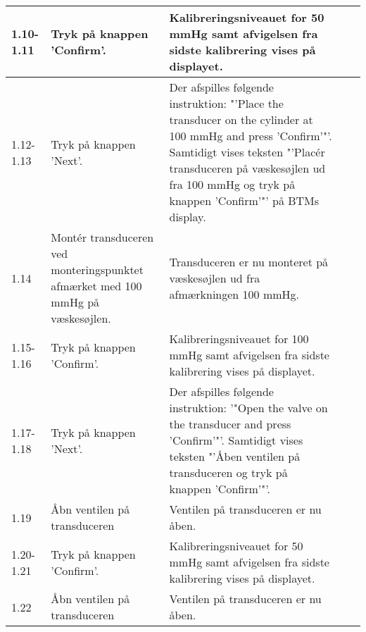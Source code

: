 \begin{tabular}{|p{1cm}|p{3cm}|p{4cm}|p{4cm}|p{2cm}|}
\hline

1.10-1.11 & Tryk på knappen 'Confirm'. & Kalibreringsniveauet for 50 mmHg samt afvigelsen fra sidste kalibrering vises på displayet. &  & \\\hline

1.12-1.13 & Tryk på knappen 'Next'. & Der afspilles følgende instruktion: "'Place the transducer on the cylinder at 100 mmHg and press 'Confirm'"'. Samtidigt vises teksten "'Placér transduceren på væskesøjlen ud fra 100 mmHg og tryk på knappen 'Confirm'"' på BTMs display. &  & \\\hline

1.14 & Montér transduceren ved monteringspunktet afmærket med 100 mmHg på væskesøjlen. & Transduceren er nu monteret på væskesøjlen ud fra afmærkningen 100 mmHg. & &  \\\hline

1.15-1.16 & Tryk på knappen 'Confirm'. & Kalibreringsniveauet for 100 mmHg samt afvigelsen fra sidste kalibrering vises på displayet. &  & \\\hline

1.17-1.18 & Tryk på knappen 'Next'. & Der afspilles følgende instruktion: '"Open the valve on the transducer and press 'Confirm'"'. Samtidigt vises teksten "'Åben ventilen på transduceren og tryk på knappen 'Confirm'"'. &  & \\\hline

1.19 & Åbn ventilen på transduceren & Ventilen på transduceren er nu åben. &  & \\\hline

1.20-1.21 & Tryk på knappen 'Confirm'. & Kalibreringsniveauet for 50 mmHg samt afvigelsen fra sidste kalibrering vises på displayet. &  & \\\hline

1.22 & Åbn ventilen på transduceren & Ventilen på transduceren er nu åben. &  & \\\hline

\end{tabular}